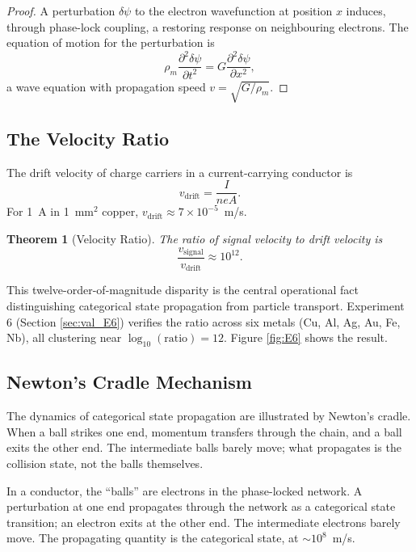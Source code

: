 \documentclass[twocolumn,10pt,a4paper]{article}
\newtheorem{theorem}{Theorem}[section]
\theoremstyle{definition}
\theoremstyle{remark}
\begin{document}
\begin{proof}
A perturbation $\delta\psi$ to the electron wavefunction at position $x$ induces, through phase-lock coupling, a restoring response on neighbouring electrons. The equation of motion for the perturbation is
\[
\rho_m \frac{\partial^2 \delta\psi}{\partial t^2} = G \frac{\partial^2 \delta\psi}{\partial x^2},
\]
a wave equation with propagation speed $v = \sqrt{G/\rho_m}$.
\end{proof}

\subsection{The Velocity Ratio}

The drift velocity of charge carriers in a current-carrying conductor is \citep{drude1900a}
\begin{equation}
v_{\mathrm{drift}} = \frac{I}{neA}.
\label{eq:drift_velocity}
\end{equation}
For 1~A in 1~mm$^2$ copper, $v_{\mathrm{drift}} \approx 7\times10^{-5}$~m/s.

\begin{theorem}[Velocity Ratio]
\label{thm:velocity_ratio}
The ratio of signal velocity to drift velocity is
\begin{equation}
\frac{v_{\mathrm{signal}}}{v_{\mathrm{drift}}} \approx 10^{12}.
\label{eq:velocity_ratio}
\end{equation}
\end{theorem}

This twelve-order-of-magnitude disparity is the central operational fact distinguishing categorical state propagation from particle transport. Experiment 6 (Section \ref{sec:val_E6}) verifies the ratio across six metals (Cu, Al, Ag, Au, Fe, Nb), all clustering near $\log_{10}(\mathrm{ratio}) = 12$. Figure \ref{fig:E6} shows the result.

\subsection{Newton's Cradle Mechanism}

The dynamics of categorical state propagation are illustrated by Newton's cradle. When a ball strikes one end, momentum transfers through the chain, and a ball exits the other end. The intermediate balls barely move; what propagates is the collision state, not the balls themselves.

In a conductor, the ``balls'' are electrons in the phase-locked network. A perturbation at one end propagates through the network as a categorical state transition; an electron exits at the other end. The intermediate electrons barely move. The propagating quantity is the categorical state, at $\sim 10^8$~m/s.
\end{document}
